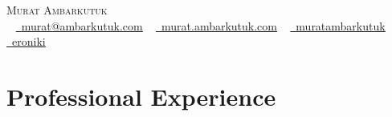 \documentclass[letterpaper,11pt]{article}
\begin{document}
\nocite{ambarkutuk2024sensors}
\nocite{ambarkutuk2023}
\nocite{ambarkutuk2021uncertainty}
\nocite{sa2021investigation}
\nocite{sa2020towards}
\nocite{ambarkutuk2017grid}
\nocite{ocak2015image}

\begin{center}
    {\Huge \scshape Murat Ambarkutuk} \\ \vspace{1pt}
	~ \href{mailto:murat@ambarkutuk.com}{\raisebox{-0.2\height}\faEnvelope\  \underline{murat@ambarkutuk.com}}
	~ \href{https://murat.ambarkutuk.com}{\raisebox{-0.2\height}\faBookmark\  \underline{murat.ambarkutuk.com}}
    ~ \href{https://linkedin.com/in/muratambarkutuk/}{\raisebox{-0.2\height}\faLinkedin\ \underline{muratambarkutuk}}
	~ \href{https://github.com/eroniki}{\raisebox{-0.2\height}\faGithub\ \underline{eroniki}}
	\vspace{-8pt}
\end{center}

\section{Professional Experience}
  \resumeSubHeadingListStart
\end{document}

